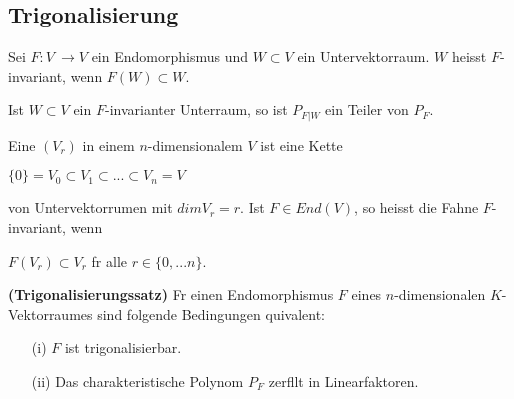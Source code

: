 \documentclass[9pt, a4paper, twocolumn, landscape]{article}
\newcommand{\comment}[1]{}
\begin{document}
\subsection{Trigonalisierung} %
\begin{definition}
Sei $F : V\ \rightarrow V$ ein Endomorphismus und $W \subset V$ ein Untervektorraum. $W$ heisst $F$-invariant, wenn $F(W) \subset W$.
\end{definition}
\begin{remark}
Ist $W \subset V$ ein $F$-invarianter Unterraum, so ist $P_{F|W}$ ein Teiler von $P_F$.
\end{remark}
\begin{definition}
Eine  $(V_r)$ in einem $n$-dimensionalem $V$ ist eine Kette 
\\ \centerline{ $\{0\} = V_0 \subset V_1 \subset ... \subset V_n = V$}
von Untervektorr\aee umen mit $dim V_r = r$. Ist $F \in End(V)$, so heisst die Fahne $F$-invariant, wenn 
\\ \centerline{$F(V_r) \subset V_r$ f\uee r alle $r \in \{0, ... n\}$.}
\end{definition}

\comment{
\begin{remark}
F\uee r $F \in End(V)$ sind folgende Bedingungen \aee quivalent:
\begin{enumerate}
\item[(i)] Es gibt eine $F$-invariante Fahne in $V$.
\item[(ii)] Es gibt eine Basis $\mathcal{B}$ von V, so dass $M_\mathcal{B}  (F)$ eine obere Dreiecksmatrix ist.
\end{enumerate}
\end{remark}
}


\begin{theorem} \textbf{(Trigonalisierungssatz)} F\uee r einen Endomorphismus $F$ eines $n$-dimensionalen $K$-Vektorraumes sind folgende Bedingungen \aee quivalent:
\begin{enumerate}
\item[(i)] $F$ ist trigonalisierbar.
\item[(ii)] Das charakteristische Polynom $P_F$ zerf\aee llt in Linearfaktoren.
\end{enumerate}
\end{theorem}

\comment{
\begin{corollary} Jeder Endomorphismus eines endlich-dimensionalen komplexen Vektorraumes ist trigonalisierbar.
\end{corollary}
}
\end{document}
